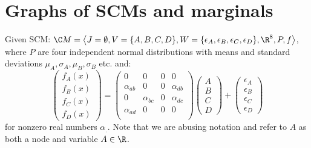 \section{Graphs of SCMs and marginals}
Given SCM: $\C M = \left\langle J=\emptyset, V=\{A, B, C, D\}, W=\{\epsilon_A, \epsilon_B, \epsilon_C, \epsilon_D\}, \R^8, P, f \right\rangle$, where $P$ are four independent normal distributions with means and standard deviations $\mu_A, \sigma_A, \mu_B, \sigma_B$ etc. and:
\[
\begin{pmatrix}
	f_A(x) \\ f_B(x) \\ f_C(x) \\ f_D(x)
\end{pmatrix}
= 
\begin{pmatrix}
	0 & 0 & 0 & 0 \\
	\alpha_{ab} & 0 & 0 & \alpha_{db} \\
	0 & \alpha_{bc} & 0 & \alpha_{dc} \\
	\alpha_{ad} & 0 & 0 & 0 \\
\end{pmatrix}
\begin{pmatrix}
	A \\ B \\ C \\ D
\end{pmatrix}
+
\begin{pmatrix}
	\epsilon_A \\ \epsilon_B \\ \epsilon_C \\ \epsilon_D
\end{pmatrix}
\]
for nonzero real numbers $\alpha_.$. Note that we are abusing notation and refer to $A$ as both a node and variable $A \in \R$.
